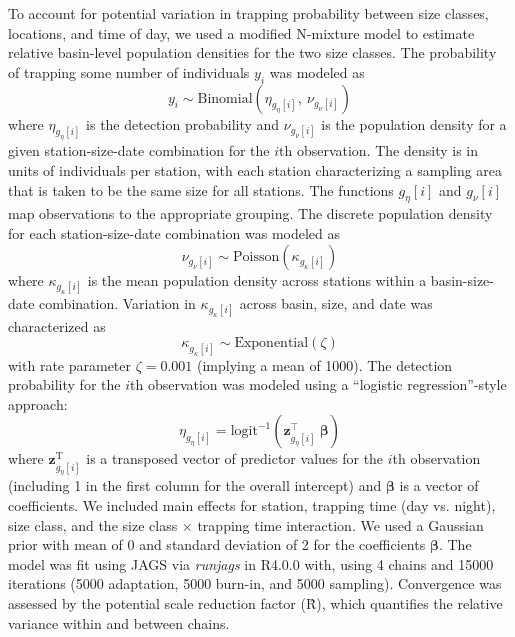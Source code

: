 \documentclass[11pt]{article}
\begin{document}
{To account for potential variation in trapping probability between size classes,
locations, and time of day, 
we used a modified N-mixture model to estimate relative basin-level population densities
for the two size classes.
The probability of trapping some number of individuals $y_i$ 
was modeled as
%
\begin{equation}
  y_i \sim \text{Binomial}\left(\eta_{g_{\eta}[i]}, ~\nu_{g_{\nu}[i]}\right)
\end{equation}
%
where $\eta_{g_{\eta}[i]}$ is the detection probability 
and $\nu_{g_{\nu}[i]}$ is the population density for a given 
station-size-date combination for the $i$th observation.
The density is in units of individuals per station, 
with each station characterizing a sampling area that is 
taken to be the same size for all stations.
The functions ${g_{\eta}[i]}$ and ${g_{\nu}[i]}$ map observations to the 
appropriate grouping. 
The discrete population density for each station-size-date combination was modeled as
%
\begin{equation}
  \nu_{g_{\nu}[i]} \sim \text{Poisson}\left(\kappa_{g_{\kappa}[i]}\right)
\end{equation}
%
where $\kappa_{g_{\kappa}[i]}$ is the mean population density across stations 
within a basin-size-date combination. 
Variation in $\kappa_{g_{\kappa}[i]}$ across basin, size, 
and date was characterized as 
%
\begin{equation}
  \kappa_{g_{\kappa}[i]} \sim 
    \text{Exponential}\left(\zeta \right)
\end{equation}
%
with rate parameter $\zeta = 0.001$ (implying a mean of 1000).
The detection probability for the $i$th observation was modeled using a 
``logistic regression''-style approach:
%
\begin{equation}
  \eta_{g_{\eta}[i]} = 
    \text{logit}^{-1}\left(\mathbf{z}_{g_{\eta}[i]}^\top~{\boldsymbol\beta}\right)
\end{equation}
%
\noindent where $\mathbf{z}_{g_{\eta}[i]}^\text{T}$ is a transposed vector 
of predictor values for the $i$th observation
(including 1 in the first column for the overall intercept)
and $\boldsymbol\beta$ is a vector of coefficients. 
We included main effects for station, trapping time (day vs. night), size class,
and the size class $\times$ trapping time interaction.
We used a Gaussian prior with mean of 0 and standard deviation of 2 
for the coefficients $\boldsymbol\beta$.
The model was fit using JAGS via \emph{runjags} in R4.0.0 with,
using 4 chains and 15000 iterations (5000 adaptation, 5000 burn-in, and 5000 sampling).
Convergence was assessed by the potential scale reduction factor (\^{R}),
which quantifies the relative variance within and between chains. 





}
\end{document}
